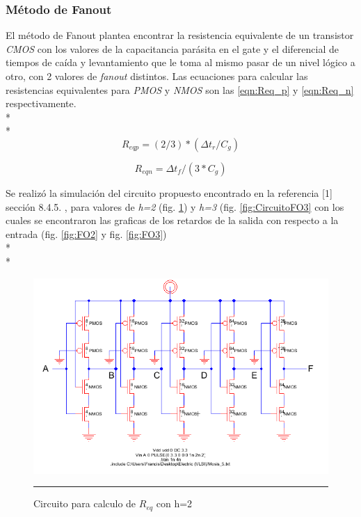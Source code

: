 \documentclass[12pt,a4paper]{article} %
\begin{document}
\subsubsection{Método de Fanout}

El método de Fanout plantea encontrar la resistencia equivalente de un transistor \textit{CMOS} con los valores de la capacitancia parásita en el gate y el diferencial de tiempos de caída y levantamiento que le toma al mismo pasar de un nivel lógico a otro, con 2 valores de \textit{fanout} distintos. Las ecuaciones para calcular las resistencias equivalentes para \textit{PMOS} y \textit{NMOS} son las \ref{eqn:Req_p} y \ref{eqn:Req_n} respectivamente.\\*
\\*
\begin{equation}\label{eqn:Req_p}
R_{eqp}=(2/3)*( \Delta t_{r}/C_{g})
\end{equation}

\begin{equation}\label{eqn:Req_n}
R_{eqn}= \Delta t_{f}/(3*C_{g})
\end{equation}

Se realizó la simulación del circuito propuesto encontrado en la referencia [1] sección 8.4.5. , para valores de \textit{h=2} (fig. \ref{fig:CircuitoFO2}) y \textit{h=3} (fig. \ref{fig:CircuitoFO3} con los cuales se encontraron las graficas de los retardos de la salida con respecto a la entrada (fig. \ref{fig:FO2} y fig. \ref{fig:FO3})\\*
\\*
\begin{figure}[htbp]
\begin{center}
    \includegraphics[scale=0.5]{./CircuitoFO2.png}
    \rule{35em}{0.5pt}
  \caption[Captura]{Circuito para calculo de $R_{eq}$ con h=2}
  \label{fig:CircuitoFO2}
  \end{center}
\end{figure}
\end{document}
